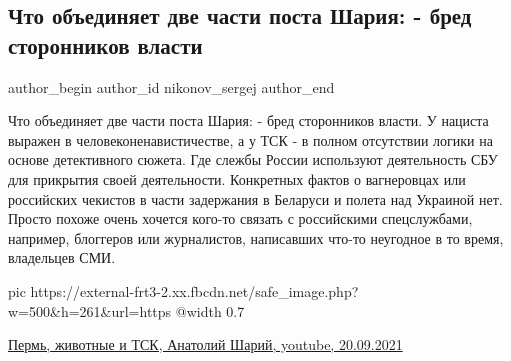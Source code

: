  
 
 
 
 
 
\subsection{Что объединяет две части поста Шария: - бред сторонников власти}
\label{sec:21_09_2021.fb.nikonov_sergej.11.post_sharija_vlast_vagnerovcy}
 
\ifcmt
 author_begin
   author_id nikonov_sergej
 author_end
\fi

Что объединяет две части поста Шария: - бред сторонников власти. У нациста
выражен в человеконенавистичестве, а у ТСК - в полном отсутствии логики на
основе детективного сюжета. Где слежбы России используют деятельность СБУ для
прикрытия своей деятельности. Конкретных фактов о вагнеровцах или российских
чекистов в части задержания в Беларуси и полета над Украиной нет. Просто похоже
очень хочется кого-то связать с российскими спецслужбами, например, блоггеров
или журналистов, написавших что-то неугодное в то время, владельцев СМИ.

\ifcmt
  pic https://external-frt3-2.xx.fbcdn.net/safe_image.php?w=500&h=261&url=https%
  @width 0.7
\fi

\href{https://www.youtube.com/watch?v=5zvexgMDeWM}{%
Пермь, животные и ТСК, Анатолий Шарий, youtube, 20.09.2021%
}
